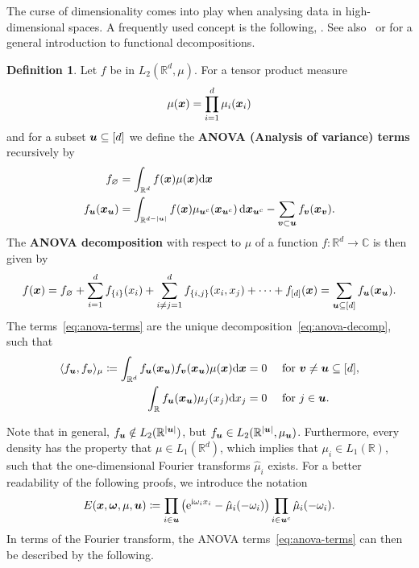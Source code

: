 \documentclass{article}
\renewcommand{\vec}[1]{\ensuremath \mathbf{\boldsymbol{#1}}}
\newcommand{\w}{\ensuremath{\vec \omega}}
\newcommand{\x}{\ensuremath{\vec x}}
\newcommand{\R}{\ensuremath{\mathbb{R}}}
\newcommand{\C}{\ensuremath{\mathbb{C}}}
\newcommand{\dx}{\mathrm{d}}
\newcommand{\e}{\mathrm{e}}
\newcommand{\im}{\mathrm{i}}
\renewcommand{\d}{\, \mathrm{d}}
\theoremstyle{definition}
\newtheorem{definition}[theorem]{Definition}
\numberwithin{equation}{section}
\begin{document}
The curse of dimensionality comes into play when analysing data in high-dimensional spaces. A frequently used concept is the following, \cite{CaMoOw97, LiOw06,Holtz11}. See also~\cite[Chapter 8.4]{Mo22} or \cite[Appendix]{Owen23} for a general introduction to functional decompositions. 
\begin{definition}\label{def:anova-terms}
Let $f$ be in $L_2(\R^d,\mu)$. For a tensor product measure 
\begin{equation}\label{eq:mu_prod}
\mu(\vec x) = \prod_{i=1}^d \mu_i(\vec x_i)
\end{equation}
and for a subset $\vec u\subseteq[d]$ we define the \textbf{ANOVA (Analysis of variance) terms} recursively by 
\begin{align}\label{eq:anova-terms}
f_{\varnothing} &= \int_{\R^d} f(\x) \mu(\x) \dx \x \notag\\
f_{\vec u}(\vec x_{\vec u}) &=\int_{\R^{d-|\vec u|}}f(\vec x) \mu_{\vec u^c}(\vec x_{\vec u^c})\d \vec x_{\vec u^c}-\sum_{\vec v\subset \vec u}f_{\vec v}(\vec x_{\vec v}).
\end{align}
The\textbf{ ANOVA decomposition} with respect to $\mu$ of a function ${f\colon \R^d\to \C}$ is then given by
\begin{equation}\label{eq:anova-decomp}
f(\vec x)=f_{\varnothing}+\sum_{i=1}^d f_{\{i\}}(x_i)+\sum_{i\neq j=1}^d f_{\{i,j\}}(x_i,x_j)+\cdots+f_{[d]}(\vec x)=\sum_{\vec u\subseteq[d]}f_{\vec u}(\vec x_{\vec u}).
\end{equation}
The terms~\eqref{eq:anova-terms} are the unique decomposition~\eqref{eq:anova-decomp}, 
such that 
\begin{align}
\langle f_{\vec u},f_{\vec v} \rangle_\mu \coloneqq \int_{\R^d} f_{\vec u}(\x_{\vec u})f_{\vec v}(\x_{\vec u})\mu(\x) \dx \x &= 0 \quad \text{ for } \vec v\neq \vec u\subseteq[d],\label{eq:orth}\\
\int_{\R} f_{\vec u}(\x_{\vec u}) \mu_j(x_j)\dx x_j &= 0 \quad \text{ for } j\in  \vec u. \label{eq:zero_mean}
\end{align}
\end{definition} 
Note that in general, $f_{\vec u}\notin L_2(\R^{|\vec u|})$, but $f_{\vec u}\in L_2(\R^{|\vec u|},\mu_{\vec u})$. Furthermore, every density has the property that $\mu\in L_1(\R^d)$, which implies that $\mu_i \in L_1(\R)$, such that the one-dimensional Fourier transforms $\hat{\mu}_i$ exists.
For a better readability of the following proofs, we introduce the notation
\begin{equation}\label{eq:def_E}
E(\x,\w,\mu, \vec u) \coloneqq \prod_{i\in \vec u}\left(\e^{\im \omega_i x_i } - \hat{\mu}_i( -\omega_i) \right)\prod_{i\in \vec u^c}\hat{\mu}_i( -\omega_i).
\end{equation} 
In terms of the Fourier transform, the ANOVA terms~\eqref{eq:anova-terms} can then be described by the following.
\end{document}
